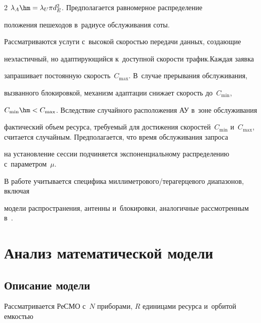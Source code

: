 \begin{multicols}{2}
$\lambda_A\hm=\lambda_{U}\pi{}d_{E}^2$. Пред\-по\-ла\-га\-ет\-ся рав\-но\-мер\-ное рас\-пре\-де\-ле\-ние 

положения пешеходов в~радиусе обслуживания \mbox{соты}.





Рассматриваются услуги с~высокой ско\-ростью передачи данных, соз\-да\-ющие 

неэластичный, но адап\-ти\-ру\-ющий\-ся к~до\-ступ\-ной ско\-рости трафик.\linebreak Каж\-дая за\-яв\-ка 

запрашивает по\-сто\-ян\-ную ско\-рость~$C_{\max}$. В~случае прерывания обслуживания, 

вызванного блокировкой, механизм адап\-та\-ции снижает ско\-рость до~$C_{\min}$, 

$C_{\min}\hm<C_{\max}$. \mbox{Вследствие} случайного расположения АУ в~зоне обслуживания 

фактический объем ресурса, тре\-бу\-емый для достижения скоростей~$C_{\min}$ и~$C_{\max}$, считается случайным. Предполагается, что время обслуживания запроса 

на уста\-нов\-ле\-ние сес\-сии подчиняется экспоненциальному распределению с~па\-ра\-мет\-ром~$\mu$.



В работе учитывается специфика мил\-ли\-мет\-ро\-во\-го/те\-ра\-гер\-це\-во\-го диапазонов, включая 

модели распространения, антенны и~блокировки, аналогичные рас\-смот\-рен\-ным в~\cite{petrov2017interference, gapeyenko2017temporal, begishev2019estimate}.



\section{Анализ математической модели}





\subsection{Описание модели}






Рассматривается РеСМО с~$N$ приборами, $R$ единицами ресурса и~орбитой ем\-костью 


\end{multicols}
